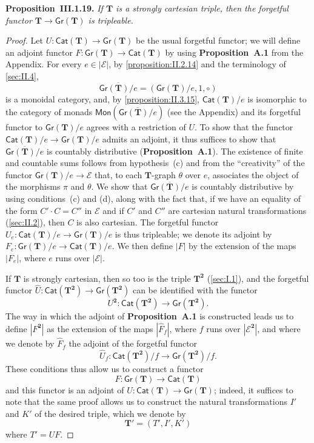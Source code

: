 \documentclass[fleqn]{article}
\newenvironment{itenv}[1]
  {\phantomsection\par\medskip\noindent\textbf{#1.}\itshape}
  {\par\medskip}
\newcommand{\oldpage}[1]{\marginpar{\footnotesize$\Big\vert$ \textit{p.~#1}}}
\newcommand{\unsure}[1]{{\color{purple}\textbf{#1}}}
\newcommand{\TT}{\mathbf{T}}
\newcommand{\cat}[1]{\mathcal{#1}}
\newcommand{\Cat}[1]{\mathsf{#1}}
\newcommand{\set}[1]{|#1|}
\newcommand{\Gr}[1]{\Cat{Gr}(#1)}
\newcommand{\Mon}[1]{\Cat{Mon}(#1)}
\begin{document}
\begin{itenv}{Proposition~III.1.19}
  If $\TT$ is a strongly cartesian triple, then the forgetful functor $\Cat{\TT}\to\Gr{\TT}$ is tripleable.
\end{itenv}

\begin{proof}
  Let $U\colon\Cat{Cat}(\TT)\to\Gr{\TT}$ be the usual forgetful functor;
  we will define an adjoint functor $F\colon\Gr{\TT}\to\Cat{Cat}(\TT)$ by using \unsure{Proposition~A.1} from the Appendix.
  For every $e\in\set{\cat{E}}$, by \cref{proposition:II.2.14} and the terminology of \cref{sec:II.4},
  \[
    \overline{\Gr{\TT}/e}
    = (\Gr{\TT}/e,1,\circ)
  \]
  \oldpage{268}
  is a monoidal category, and, by \cref{proposition:II.3.15}, $\Cat{Cat}(\TT)/e$ is isomorphic to the category of monads $\Mon{\overline{\Gr{\TT}/e}}$ (see the Appendix) and its forgetful functor to $\Gr{\TT}/e$ agrees with a restriction of $U$.
  To show that the functor $\Cat{Cat}(\TT)/e\to\Gr{\TT}/e$ admits an adjoint, it thus suffices to show that $\overline{\Gr{\TT}/e}$ is countably distributive (\unsure{Proposition~A.1}).
  The existence of finite and countable sums follows from hypothesis~(c) and from the ``creativity'' of the functor $\Gr{\TT}/e\to\cat{E}$ that, to each $\TT$-graph $\theta$ over $e$, associates the object of the morphisms $\pi$ and $\theta$.
  We show that $\overline{\Gr{\TT}/e}$ is countably distributive by using conditions~(c) and (d), along with the fact that, if we have an equality of the form $C'\cdot C=C''$ in $\cat{E}$ and if $C'$ and $C''$ are cartesian natural transformations (\cref{sec:II.2}), then $C$ is also cartesian.
  The forgetful functor $U_e\colon\Cat{Cat}(\TT)/e\to\Gr{\TT}/e$ is thus tripleable;
  we denote its adjoint by $F_e\colon\Gr{\TT}/e\to\Cat{Cat}(\TT)/e$.
  We then define $\set{F}$ by the extension of the maps $\set{F_e}$, where $e$ runs over $\set{\cat{E}}$.

  If $\TT$ is strongly cartesian, then so too is the triple $\TT^\mathbf{2}$ (\cref{sec:I.1}), and the forgetful functor $\hat{U}\colon\Cat{Cat}(\TT^\mathbf{2})\to\Gr{\TT^\mathbf{2}}$ can be identified with the functor
  \[
    U^\mathbf{2}\colon \Cat{Cat}(\TT^\mathbf{2})
    \to \Gr{\TT^\mathbf{2}}.
  \]
  The way in which the adjoint of \unsure{Proposition~A.1} is constructed leads us to define $\set{F^\mathbf{2}}$ as the extension of the maps $\set{\hat{F}_f}$, where $f$ runs over $\set{\cat{E}^\mathbf{2}}$, and where we denote by $\hat{F}_f$ the adjoint of the forgetful functor
  \[
    \hat{U}_f\colon \Cat{Cat}(\TT^\mathbf{2})/f
    \to \Gr{\TT^\mathbf{2}}/f.
  \]
  These conditions thus allow us to construct a functor
  \[
    F\colon\Gr{\TT}
    \to \Cat{Cat}(\TT)
  \]
  and this functor is an adjoint of $U\colon\Cat{Cat}(\TT)\to\Gr{\TT}$;
  indeed, it suffices to note that the same proof allows us to construct the natural transformations $I'$ and $K'$ of the desired triple, which we denote by
  \[
    \TT'=(T',I',K')
  \]
  where $T'=UF$.


\end{proof}
\end{document}
